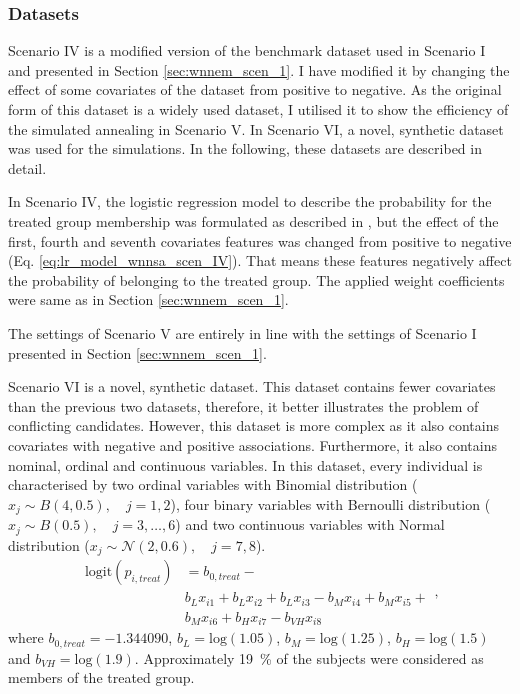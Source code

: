 		\subsubsection{Datasets}
		\label{sec:datasets_wnnsa}
										
		Scenario IV is a modified version of the benchmark dataset used in Scenario I and presented in Section \ref{sec:wnnem_scen_1}. I have modified it by changing the effect of some covariates of the dataset from positive to negative. As the original form of this dataset is a widely used dataset, I utilised it to show the efficiency of the simulated annealing in Scenario V. In Scenario VI, a novel, synthetic dataset was used for the simulations. In the following, these datasets are described in detail. 
										
		In Scenario IV, the logistic regression model to describe the probability for the treated group membership was formulated as described in \cite{austin2011comparing}, but the effect of the first, fourth and seventh covariates features was changed from positive to negative (Eq. \ref{eq:lr_model_wnnsa_scen_IV}). That means these features negatively affect the probability of belonging to the treated group. The applied weight coefficients were same as in Section \ref{sec:wnnem_scen_1}.
										
		The settings of Scenario V are entirely in line with the settings of Scenario I presented in Section \ref{sec:wnnem_scen_1}.   
										
		Scenario VI is a novel, synthetic dataset. This dataset contains fewer covariates than the previous two datasets, therefore, it better illustrates the problem of conflicting candidates. However, this dataset is more complex as it also contains covariates with negative and positive associations. Furthermore, it also contains nominal, ordinal and continuous variables. In this dataset, every individual is characterised by two ordinal variables with Binomial distribution ($x_j\sim B(4,0.5), \quad j=1, 2$), four binary variables with Bernoulli distribution ($x_j\sim B(0.5), \quad j=3,\dots,6$) and two continuous variables with Normal distribution ($x_j\sim \mathcal{N}(2, 0.6), \quad j=7, 8$).
		\begin{equation}
			\label{eq:lr_model_wnnsa_scen_IV}
			\begin{split}
				\textrm{logit}(p_{i,treat}) &= b_{0,treat} - \\
				& b_L x_{i1} + b_L x_{i2} + b_L x_{i3} - b_M x_{i4} + b_M x_{i5} +  \\
				& b_M x_{i6} + b_H x_{i7} - b_{VH} x_{i8}
			\end{split},
		\end{equation}  
		where $b_{0,treat}=-1.344090$, $b_L=\textrm{log}(1.05)$, $b_M=\textrm{log}(1.25)$, $b_H=\textrm{log}(1.5)$ and $b_{VH}=\textrm{log}(1.9)$. Approximately \SI{19}{\percent} of the subjects were considered as members of the treated group.
										
